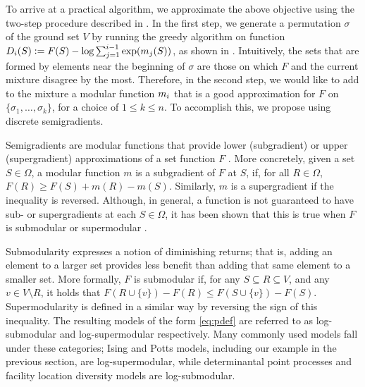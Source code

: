 
To arrive at a practical algorithm, we approximate the above objective using the two-step procedure described in .
In the first step, we generate a permutation $\sigma$ of the ground set $V$ by running the greedy algorithm on function $D_i(S) \vcentcolon= F(S) - \log \sum_{j=1}^{i-1} \exp(m_j(S))$, as shown in .
Intuitively, the sets that are formed by elements near the beginning of $\sigma$ are those on which $F$ and the current mixture disagree by the most.
Therefore, in the second step, we would like to add to the mixture a modular function $m_i$ that is a good approximation for $F$ on $\{\sigma_1, \ldots, \sigma_k\}$, for a choice of $1 \leq k \leq n$.
To accomplish this, we propose using discrete semigradients.

Semigradients are modular functions that provide lower (subgradient) or upper (supergradient) approximations of a set function $F$ \citep{fujishige05,iyer13}.
More concretely, given a set $S \in \Omega$, a modular function $m$ is a subgradient of $F$ at $S$, if, for all $R \in \Omega$, $F(R) \geq F(S) + m(R) - m(S)$.
Similarly, $m$ is a supergradient if the inequality is reversed.
Although, in general, a function is not guaranteed to have sub- or supergradients at each $S \in \Omega$, it has been shown that this is true when $F$ is submodular or supermodular \citep{fujishige05, jegelka11, iyer12}.

Submodularity expresses a notion of diminishing returns; that is, adding an element to a larger set provides less benefit than adding that same element to a smaller set.
More formally, $F$ is submodular if, for any $S \subseteq R \subseteq V$, and any $v \in V \setminus R$, it holds that $F(R \cup \{v\}) - F(R) \leq F(S \cup \{v\}) - F(S)$.
Supermodularity is defined in a similar way by reversing the sign of this inequality.
The resulting models of the form \eqref{eq:pdef} are referred to as log-submodular and log-supermodular respectively.
Many commonly used models fall under these categories; Ising and Potts models, including our example in the previous section, are log-supermodular, while determinantal point processes and facility location diversity models are log-submodular.

